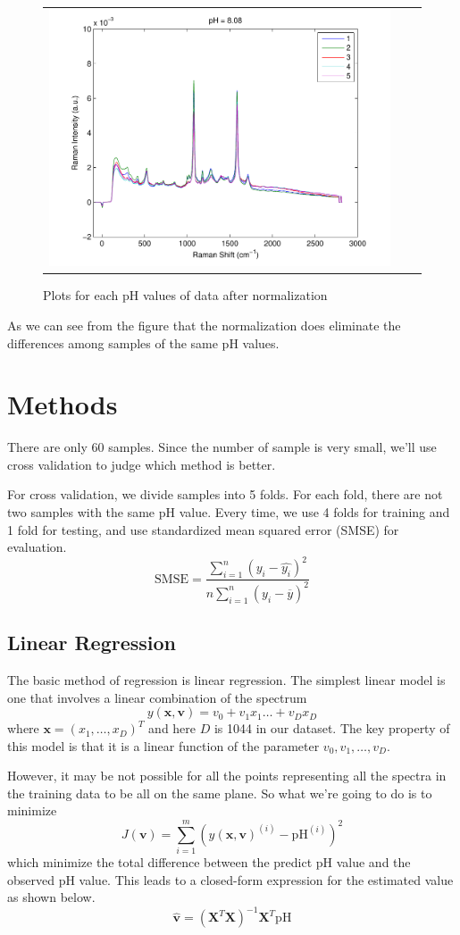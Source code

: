 \documentclass[a4paper]{article}
\newcommand{\bfv}{\mathbf{v}}
\newcommand{\bfx}{\mathbf{x}}
\begin{document}
\begin{figure}[h]
\begin{tabular}{ccc}
\includegraphics[width=.33\textwidth]{images/n12.pdf} \\
\end{tabular}
\caption{Plots for each pH values of data after normalization}\label{pic3}
\end{figure}

As we can see from the figure that the normalization does eliminate the differences among samples of the same pH values.
\section{Methods}
There are only 60 samples. Since the number of sample is very small, we'll use cross validation to judge which method is better.

For cross validation, we divide samples into 5 folds. For each fold, there are not two samples with the same pH value. Every time, we use 4 folds for training and 1 fold for testing, and use standardized mean squared error (SMSE) for evaluation. 
\begin{equation}
\mathrm{SMSE}=\frac{\displaystyle \sum_{i=1}^n (y_i-\hat{y_i})^2}{\displaystyle n \sum_{i=1}^n (y_i-\overline{y})^2}
\end{equation}
\subsection{Linear Regression}
The basic method of regression is linear regression. The simplest linear model is one that involves a linear combination of the spectrum
\begin{equation}
y(\bfx,\bfv)=v_0+v_1x_1\ldots+v_Dx_D
\end{equation}
where $\bfx=(x_1,\ldots,x_D)^T$ and here $D$ is 1044 in our dataset. The key property of this model is that it is a linear function of the parameter $v_0,v_1,\ldots,v_D$. 

However, it may be not possible for all the points representing all the spectra in the training data to be all on the same plane. So what we're going to do is to minimize
\begin{equation}
J(\bfv)=\sum_{i=1}^m (y(\bfx,\bfv)^{(i)}-\mathrm{pH}^{(i)})^2
\end{equation}
which minimize the total difference between the predict pH value and the observed pH value. This leads to a closed-form expression for the estimated value as shown below.
\begin{equation}
\hat{\bfv}=(\mathbf{X}^T\mathbf{X})^{-1}\mathbf{X}^T\mathbf{\mathrm{pH}}
\end{equation}
\end{document}
